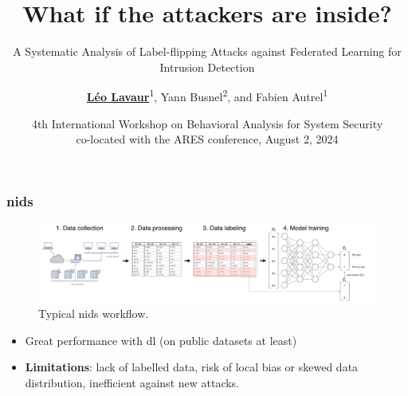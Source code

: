 \documentclass[color,t,presentation,english,aspectratio=169]{beamer}
\title{\vspace{3\baselineskip}What if the attackers are inside?\\}
\subtitle{A Systematic Analysis of Label-flipping Attacks against Federated Learning for Intrusion Detection\\\linebreak}
\author{\underline{\textbf{Léo Lavaur}}\textsuperscript{1}, Yann Busnel\textsuperscript{2}, and Fabien Autrel\textsuperscript{1}}
\institute{\textsuperscript{1} IMT Atlantique, \textsuperscript{2} IMT Nord Europe\\}
\date{\scriptsize 4th International Workshop on Behavioral Analysis for System Security\\ co-located with the ARES conference, August 2, 2024}
\begin{document}
\maketitle

\begin{frame}
	\frametitle{\acrfull{nids}}

	\begin{figure}
		\centering
		\includegraphics[width=\linewidth]{./figures/mlp-workflow.pdf}
		\caption{Typical \acrshort{nids} workflow.}
	\end{figure}

	\begin{itemize}
		\item Great performance with \Gls{dl} (on public datasets at least)
		\item \textbf{Limitations}: lack of labelled data, risk of local bias or skewed data distribution, inefficient against new attacks.
	\end{itemize}

\end{frame}
\end{document}

